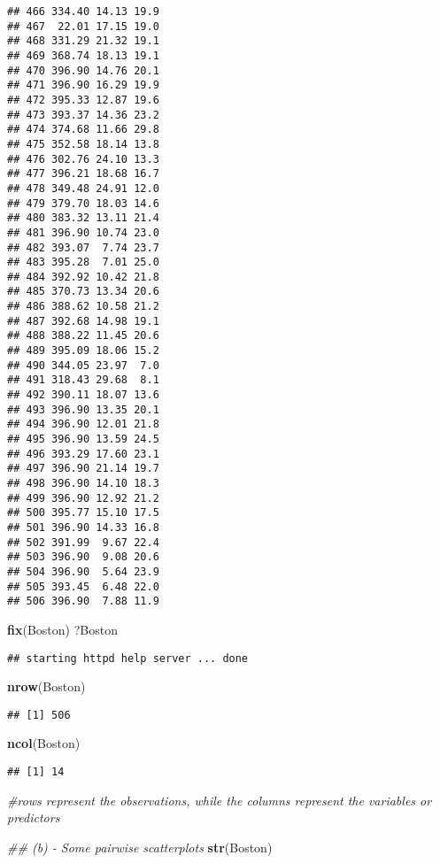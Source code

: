 \documentclass[]{article}
\newenvironment{Shaded}{\begin{snugshade}}{\end{snugshade}}
\newcommand{\CommentTok}[1]{\textcolor[rgb]{0.56,0.35,0.01}{\textit{#1}}}
\newcommand{\KeywordTok}[1]{\textcolor[rgb]{0.13,0.29,0.53}{\textbf{#1}}}
\newcommand{\NormalTok}[1]{#1}
\begin{document}
\begin{verbatim}
## 466 334.40 14.13 19.9
## 467  22.01 17.15 19.0
## 468 331.29 21.32 19.1
## 469 368.74 18.13 19.1
## 470 396.90 14.76 20.1
## 471 396.90 16.29 19.9
## 472 395.33 12.87 19.6
## 473 393.37 14.36 23.2
## 474 374.68 11.66 29.8
## 475 352.58 18.14 13.8
## 476 302.76 24.10 13.3
## 477 396.21 18.68 16.7
## 478 349.48 24.91 12.0
## 479 379.70 18.03 14.6
## 480 383.32 13.11 21.4
## 481 396.90 10.74 23.0
## 482 393.07  7.74 23.7
## 483 395.28  7.01 25.0
## 484 392.92 10.42 21.8
## 485 370.73 13.34 20.6
## 486 388.62 10.58 21.2
## 487 392.68 14.98 19.1
## 488 388.22 11.45 20.6
## 489 395.09 18.06 15.2
## 490 344.05 23.97  7.0
## 491 318.43 29.68  8.1
## 492 390.11 18.07 13.6
## 493 396.90 13.35 20.1
## 494 396.90 12.01 21.8
## 495 396.90 13.59 24.5
## 496 393.29 17.60 23.1
## 497 396.90 21.14 19.7
## 498 396.90 14.10 18.3
## 499 396.90 12.92 21.2
## 500 395.77 15.10 17.5
## 501 396.90 14.33 16.8
## 502 391.99  9.67 22.4
## 503 396.90  9.08 20.6
## 504 396.90  5.64 23.9
## 505 393.45  6.48 22.0
## 506 396.90  7.88 11.9
\end{verbatim}

\begin{Shaded}
\begin{Highlighting}[]
\KeywordTok{fix}\NormalTok{(Boston)}
\NormalTok{?Boston}
\end{Highlighting}
\end{Shaded}

\begin{verbatim}
## starting httpd help server ... done
\end{verbatim}

\begin{Shaded}
\begin{Highlighting}[]
\KeywordTok{nrow}\NormalTok{(Boston)}
\end{Highlighting}
\end{Shaded}

\begin{verbatim}
## [1] 506
\end{verbatim}

\begin{Shaded}
\begin{Highlighting}[]
\KeywordTok{ncol}\NormalTok{(Boston)}
\end{Highlighting}
\end{Shaded}

\begin{verbatim}
## [1] 14
\end{verbatim}

\begin{Shaded}
\begin{Highlighting}[]
\CommentTok{#rows represent the observations, while the columns represent the variables or predictors}

\CommentTok{## (b) - Some pairwise scatterplots}
\KeywordTok{str}\NormalTok{(Boston)}
\end{Highlighting}
\end{Shaded}
\end{document}
